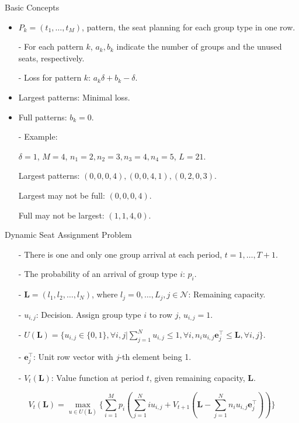   \begin{frame}{Basic Concepts}
    \begin{itemize}
      \item $P_{k} = (t_1, \ldots, t_M)$, pattern, the seat planning for each group type in one row.
          
          - For each pattern $k$, $a_k, b_k$ indicate the number of groups and the unused seats, respectively.
          
          - Loss for pattern $k$: $a_k \delta + b_k - \delta$.
      \item Largest patterns: Minimal loss. 
      \item Full patterns: $b_k =0$.
      \item[-] {\color{blue} Example}: 
      
      $\delta = 1$, $M =4$, $n_1 = 2, n_2 = 3, n_3 = 4, n_4 = 5$, $L = 21$.
      
      Largest patterns: $(0, 0, 0, 4), (0, 0, 4, 1), (0, 2, 0, 3)$.

      Largest may not be full: $(0, 0, 0, 4)$.

      Full may not be largest: $(1, 1, 4, 0)$.
    \end{itemize}
  \end{frame}

  \begin{frame}{Dynamic Seat Assignment Problem}
    \centering
    \small
    \begin{itemize}
    \item[-] There is one and only one group arrival at each period, $t = 1, \ldots, T+1$. 
    \item[-] The probability of an arrival of group type $i$: $p_i$.  
    \item[-] $\mathbf{L} = (l_1, l_2, \ldots, l_{N})$, where $l_j =0,\ldots, L_j, j\in \mathcal{N}$: Remaining capacity.
    \item[-] $u_{i,j}$: Decision. Assign group type $i$ to row $j$, $u_{i,j} =1$.
    \item[-] $U(\mathbf{L}) = \{u_{i,j} \in\{0,1\}, \forall i,j| \sum_{j=1}^{N} u_{i,j} \leq 1, \forall i, n_{i}u_{i,j}\mathbf{e}_j^{\top} \leq \mathbf{L}, \forall i,j \}$.
    \item[-] $\mathbf{e}_j^{\top}$: Unit row vector with $j$-th element being 1.
    \item[-] $V_{t}(\mathbf{L})$: Value function at period $t$, given remaining capacity, $\mathbf{L}$.
    \end{itemize}

    $$V_{t}(\mathbf{L}) = \max_{u \in U(\mathbf{L})}\{ \sum_{i=1}^{M} p_i ( \sum_{j=1}^{N} i u_{i,j} + V_{t+1}(\mathbf{L}- \sum_{j=1}^{N} n_i u_{i,j}\mathbf{e}_j^{\top} ))\}$$
    \small

\end{frame}

